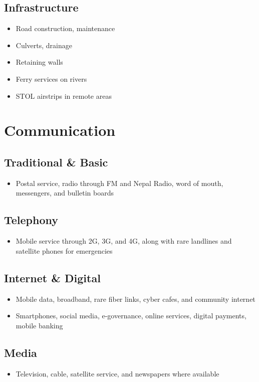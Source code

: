 \documentclass[11pt,a4paper]{article}
\begin{document}
\subsection{Infrastructure}
\begin{itemize}
    \item Road construction, maintenance
    \item Culverts, drainage
    \item Retaining walls
    \item Ferry services on rivers
    \item STOL airstrips in remote areas
\end{itemize}

\section{Communication}
\subsection{Traditional \& Basic}
\begin{itemize}
    \item Postal service, radio through FM and Nepal Radio, word of mouth, messengers, and bulletin boards
\end{itemize}
\subsection{Telephony}
\begin{itemize}
    \item Mobile service through 2G, 3G, and 4G, along with rare landlines and satellite phones for emergencies
\end{itemize}
\subsection{Internet \& Digital}
\begin{itemize}
    \item Mobile data, broadband, rare fiber links, cyber cafes, and community internet
    \item Smartphones, social media, e-governance, online services, digital payments, mobile banking
\end{itemize}
\subsection{Media}
\begin{itemize}
    \item Television, cable, satellite service, and newspapers where available
\end{itemize}
\end{document}
